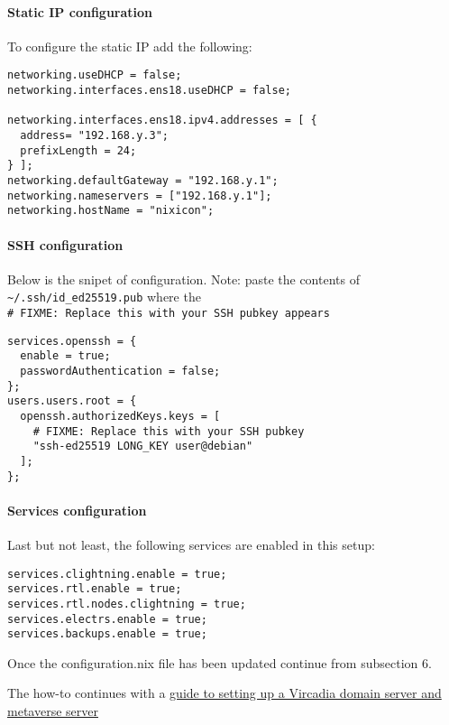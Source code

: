 \hypertarget{static-ip-configuration}{%
\paragraph{Static IP configuration}\label{static-ip-configuration}}

To configure the static IP add the following:

\begin{verbatim}
networking.useDHCP = false;
networking.interfaces.ens18.useDHCP = false;

networking.interfaces.ens18.ipv4.addresses = [ {
  address= "192.168.y.3";
  prefixLength = 24;
} ];
networking.defaultGateway = "192.168.y.1";
networking.nameservers = ["192.168.y.1"];
networking.hostName = "nixicon";
\end{verbatim}

\hypertarget{ssh-configuration}{%
\paragraph{SSH configuration}\label{ssh-configuration}}

Below is the snipet of configuration. Note: paste the contents of
\texttt{\textasciitilde{}/.ssh/id\_ed25519.pub} where the
\texttt{\#\ FIXME:\ Replace\ this\ with\ your\ SSH\ pubkey\ appears}

\begin{verbatim}
services.openssh = {
  enable = true;
  passwordAuthentication = false;
};
users.users.root = {
  openssh.authorizedKeys.keys = [
    # FIXME: Replace this with your SSH pubkey
    "ssh-ed25519 LONG_KEY user@debian"
  ];
};
\end{verbatim}

\hypertarget{services-configuration}{%
\paragraph{Services configuration}\label{services-configuration}}

Last but not least, the following services are enabled in this setup:

\begin{verbatim}
services.clightning.enable = true;
services.rtl.enable = true;
services.rtl.nodes.clightning = true;
services.electrs.enable = true;
services.backups.enable = true;
\end{verbatim}

Once the configuration.nix file has been updated continue from
subsection 6.

The how-to continues with a \href{./HOWTO_VIRCADIA.md}{guide to setting
up a Vircadia domain server and metaverse server}
